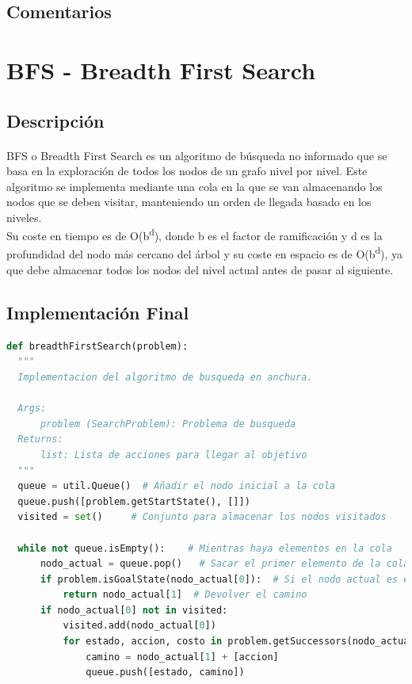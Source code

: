 \documentclass{report}
\begin{document}
        \subsection*{Comentarios}
          \paragraph*{}{

          }
      \clearpage\section{BFS - Breadth First Search}
        \subsection*{Descripción}
          \paragraph*{}{
            BFS o Breadth First Search es un algoritmo de búsqueda no informado que se basa en la exploración de todos los nodos de un grafo nivel por nivel. Este algoritmo se implementa mediante una cola en la que se van almacenando los nodos que se deben visitar, manteniendo un orden de llegada basado en los niveles.\\ 
            Su coste en tiempo es de O(b\textsuperscript{d}), donde b es el factor de ramificación y d es la profundidad del nodo más cercano del árbol y su coste en espacio es de O(b\textsuperscript{d}), ya que debe almacenar todos los nodos del nivel actual antes de pasar al siguiente.\\
          }
        \subsection*{Implementación Final}
          \begin{lstlisting}[language=Python, caption=Implementación final del BFS]
  def breadthFirstSearch(problem):
  """
  Implementacion del algoritmo de busqueda en anchura.

  Args:
      problem (SearchProblem): Problema de busqueda
  Returns:
      list: Lista de acciones para llegar al objetivo
  """
  queue = util.Queue()  # Añadir el nodo inicial a la cola
  queue.push([problem.getStartState(), []])
  visited = set()     # Conjunto para almacenar los nodos visitados

  while not queue.isEmpty():    # Mientras haya elementos en la cola
      nodo_actual = queue.pop()   # Sacar el primer elemento de la cola
      if problem.isGoalState(nodo_actual[0]):  # Si el nodo actual es el objetivo
          return nodo_actual[1]  # Devolver el camino
      if nodo_actual[0] not in visited:
          visited.add(nodo_actual[0])
          for estado, accion, costo in problem.getSuccessors(nodo_actual[0]): # Añadir los hijos del nodo actual a la cola
              camino = nodo_actual[1] + [accion]
              queue.push([estado, camino])
          \end{lstlisting}
\end{document}
